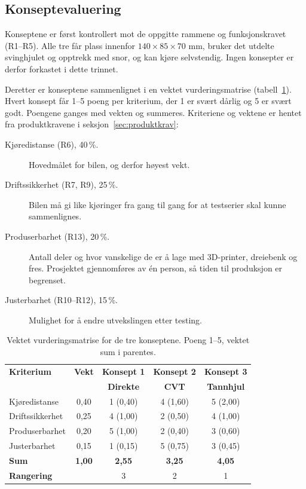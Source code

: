 \subsection{Konseptevaluering}
\label{sec:konseptevaluering}
Konseptene er først kontrollert mot de oppgitte rammene og funksjonskravet (R1--R5). Alle tre får plass innenfor $140 \times 85 \times 70$ mm, bruker det utdelte svinghjulet og opptrekk med snor, og kan kjøre selvstendig. Ingen konsepter er derfor forkastet i dette trinnet.

Deretter er konseptene sammenlignet i en vektet vurderingsmatrise (tabell~\ref{tab:vurderingsmatrise}). Hvert konsept får 1--5 poeng per kriterium, der 1 er svært dårlig og 5 er svært godt. Poengene ganges med vekten og summeres. Kriteriene og vektene er hentet fra produktkravene i seksjon~\ref{sec:produktkrav}:
\begin{description}
    \item[Kjøredistanse (R6), 40\,\%.] Hovedmålet for bilen, og derfor høyest vekt.
    \item[Driftssikkerhet (R7, R9), 25\,\%.] Bilen må gi like kjøringer fra gang til gang for at testserier skal kunne sammenlignes.
    \item[Produserbarhet (R13), 20\,\%.] Antall deler og hvor vanskelige de er å lage med 3D-printer, dreiebenk og fres. Prosjektet gjennomføres av én person, så tiden til produksjon er begrenset.
    \item[Justerbarhet (R10--R12), 15\,\%.] Mulighet for å endre utvekslingen etter testing.
\end{description}

\begin{table}[H]
    \centering
    \caption{Vektet vurderingsmatrise for de tre konseptene. Poeng 1--5, vektet sum i parentes.}
    \label{tab:vurderingsmatrise}
    \small
    \renewcommand{\arraystretch}{1.3}
    \begin{tabular}{|l|c|c|c|c|}
        \hline
        \textbf{Kriterium} & \textbf{Vekt} & \textbf{Konsept 1} & \textbf{Konsept 2} & \textbf{Konsept 3} \\
         & & \textbf{Direkte} & \textbf{CVT} & \textbf{Tannhjul} \\
        \hline
        Kjøredistanse & 0,40 & 1 (0,40) & 4 (1,60) & 5 (2,00) \\
        \hline
        Driftssikkerhet & 0,25 & 4 (1,00) & 2 (0,50) & 4 (1,00) \\
        \hline
        Produserbarhet & 0,20 & 5 (1,00) & 2 (0,40) & 3 (0,60) \\
        \hline
        Justerbarhet & 0,15 & 1 (0,15) & 5 (0,75) & 3 (0,45) \\
        \hline
        \textbf{Sum} & \textbf{1,00} & \textbf{2,55} & \textbf{3,25} & \textbf{4,05} \\
        \hline
        \textbf{Rangering} & & 3 & 2 & 1 \\
        \hline
    \end{tabular}
\end{table}

